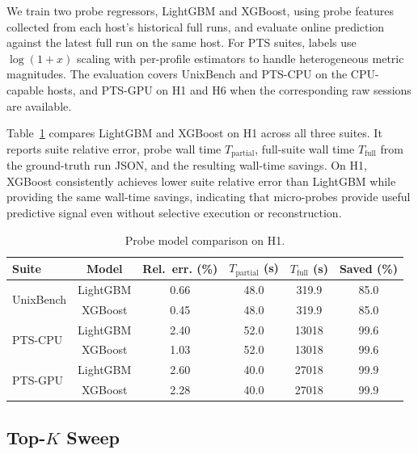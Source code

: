 \documentclass[sigplan,10pt]{acmart}
\newcommand{\ptscpu}{PTS-CPU}
\newcommand{\ptsgpu}{PTS-GPU}
\begin{document}
We train two probe regressors, LightGBM and XGBoost, using probe features collected from each host's historical full runs, and evaluate online prediction against the latest full run on the same host.
For PTS suites, labels use \(\log(1+x)\) scaling with per-profile estimators to handle heterogeneous metric magnitudes.
The evaluation covers UnixBench and \ptscpu{} on the CPU-capable hosts, and \ptsgpu{} on H1 and H6 when the corresponding raw sessions are available.

Table~\ref{tab:probe-models} compares LightGBM and XGBoost on H1 across all three suites.
It reports suite relative error, probe wall time \(T_{\mathrm{partial}}\), full-suite wall time \(T_{\mathrm{full}}\) from the ground-truth run JSON, and the resulting wall-time savings.
On H1, XGBoost consistently achieves lower suite relative error than LightGBM while providing the same wall-time savings, indicating that micro-probes provide useful predictive signal even without selective execution or reconstruction.

\begin{table}[t]
\centering
\caption{Probe model comparison on H1.}
\label{tab:probe-models}
\small
\setlength{\tabcolsep}{2pt}
\begin{tabular}{lccccc}
\toprule
\textbf{Suite} & \textbf{Model} & \textbf{Rel.\ err. (\%)} & $T_{\mathrm{partial}}$ (s) & $T_{\mathrm{full}}$ (s) & \textbf{Saved (\%)} \\
\midrule
\multirow{2}{*}{UnixBench}
 & LightGBM & 0.66 & 48.0 & 319.9 & 85.0 \\
 & XGBoost  & 0.45 & 48.0 & 319.9 & 85.0 \\
\midrule
\multirow{2}{*}{\ptscpu}
 & LightGBM & 2.40 & 52.0 & 13018 & 99.6 \\
 & XGBoost  & 1.03 & 52.0 & 13018 & 99.6 \\
\midrule
\multirow{2}{*}{\ptsgpu}
 & LightGBM & 2.60 & 40.0 & 27018 & 99.9 \\
 & XGBoost  & 2.28 & 40.0 & 27018 & 99.9 \\
\bottomrule
\end{tabular}
\end{table}

\subsection{Top-\(K\) Sweep}
\label{subsec:topk-tradeoff}
\end{document}
